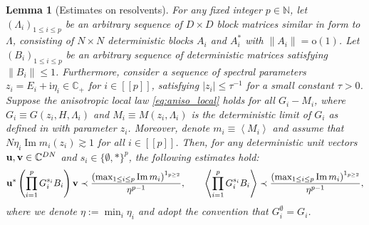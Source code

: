 \documentclass[10pt,reqno]{amsart}
\numberwithin{equation}{section}
\numberwithin{figure}{section}
\theoremstyle{plain} %
\newtheorem{lemma}[theorem]{Lemma}
\theoremstyle{definition} %
\newcommand{\C}{\mathbb{C}}
\newcommand{\N}{\mathbb{N}}
\newcommand{\ii}{\mathrm{i}}
\renewcommand{\leq}{\le}
\renewcommand{\geq}{\ge}
\newcommand{\qq}[1]{[\![{#1}]\!]}
\newcommand{\pa}[1]{\left({#1}\right)}
\newcommand{\absa}[1]{\left\lvert #1 \right\rvert}
\newcommand{\avga}[1]{\left\langle #1 \right\rangle}
\DeclareMathOperator{\im}{\mathrm{Im}}
\newcommand{\bu}{{\bf{u}}}
\newcommand{\bv}{{\bf{v}}}
\newcommand{\oo}{\mathrm{o}}
\numberwithin{equation}{section}
\begin{document}
\begin{lemma}[Estimates on resolvents]\label{lemma_necessary_estimates}
For any fixed integer $p\in \N$, let $(\Lambda_i)_{1\leq i \leq p}$ be an arbitrary sequence of $D\times D$ block matrices similar in form to $\Lambda$, consisting of $N\times N $ deterministic blocks $A_i$ and $A_i^*$ with $\|A_i\|=\oo(1)$. Let $(B_i)_{1\leq i \leq p}$ be an arbitrary sequence of deterministic matrices satisfying $\|B_i\|\le 1$.  
Furthermore, consider a sequence of spectral parameters $z_i=E_i+\ii \eta_i\in \C_+$ for $i\in\qq{p}$, satisfying $\absa{z_i}\leq \tau^{-1}$ for a small constant $\tau>0$.  
Suppose the anisotropic local law \eqref{eq:aniso_local} holds for all $G_i-M_i$, where $G_i\equiv  G(z_i,H,\Lambda_i)$ and $M_i\equiv M(z_i,\Lambda_i)$ is the deterministic limit of $G_i$ as defined in  with parameter $z_i$. 
Moreover, denote $m_i\equiv \avga{M_i}$ and assume that $ N\eta_i \im m_i (z_i) \gtrsim 1$ for all $i\in \qq{p}$. Then, for any deterministic unit vectors $\bu, \bv\in\mathbb{C}^{DN}$ and $s_i\in \{\emptyset,*\}^{p}$, the following estimates hold:
    \begin{equation}\label{entprodG}
        \begin{aligned}
                \bu^*\pa{\prod_{i=1}^p G_i^{s_i} B_i}\bv\prec \frac{\pa{\max_{1\leq i\leq p} \im m_i}^{1_{p\geq 2}}}{\eta^{p-1}},\qquad \avga{\prod_{i=1}^p G_i^{s_i} B_i}\prec \frac{\pa{\max_{1\leq i\leq p} \im m_i}^{1_{p\geq 2}}}{\eta^{p-1}},
        \end{aligned}
    \end{equation}
    where we denote $\eta:=\min_{i}\eta_i$ and adopt the convention that $G_i^\emptyset=G_i$. 
    

\end{lemma}
\end{document}
